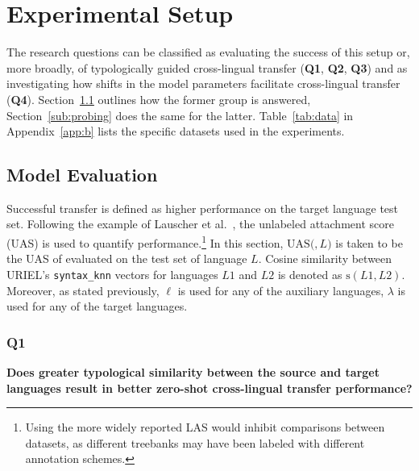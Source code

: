 
\section{Experimental Setup}

The research questions can be classified as evaluating the success of this setup or, more broadly, of typologically guided cross-lingual transfer (\textbf{Q1}, \textbf{Q2}, \textbf{Q3}) and as investigating how shifts in the model parameters facilitate cross-lingual transfer (\textbf{Q4}). Section~\ref{sub:evaluation} outlines how the former group is answered, Section~\ref{sub:probing} does the same for the latter. Table~\ref{tab:data} in Appendix~\ref{app:b} lists the specific datasets used in the experiments.

	\subsection{Model Evaluation}
	\label{sub:evaluation}
		Successful transfer is defined as higher performance on the target language test set. Following the example of Lauscher et al.~\cite{lauscher-etal-2020-zero}, the unlabeled attachment score (UAS) is used to quantify performance.\footnote{Using the more widely reported LAS would inhibit comparisons between datasets, as different treebanks may have been labeled with different annotation schemes.} In this section, $\text{UAS}($\mbase$, L)$ is taken to be the UAS of \mbase evaluated on the test set of language $L$. Cosine similarity between URIEL's \texttt{syntax\_knn} vectors for languages $L1$ and $L2$ is denoted as $\text{s}(L1, L2)$. Moreover, as stated previously, $\ell$ is used for any of the auxiliary languages, $\lambda$ is used for any of the target languages.

		\subsubsection{Q1}
		\textbf{Does greater typological similarity between the source and target languages result in better zero-shot cross-lingual transfer performance?}


